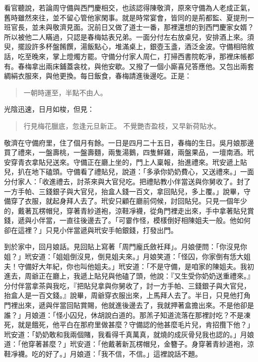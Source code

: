 看官聽說，若論周守備與西門慶相交，也該認得陳敬濟，原來守備為人老成正氣，舊時雖然來往，並不留心管他家閑事。就是時常宴會，皆同的是荊都監、夏提刑一班官長，並未與敬濟見面。況前日又做了道士一番，那裡還想的到西門慶家女婿？所以被他二人瞞過，只認是春梅姑表兄弟。一面分付左右放桌兒，安排酒上來。須臾，擺設許多杯盤餚饌，湯飯點心，堆滿桌上，銀壺玉盞，酒泛金波。守備相陪敘話，吃至晚來，掌上燈燭方罷。守備分付家人周仁，打掃西書院乾凈，那裡床帳都有。春梅拿出兩床鋪蓋衾枕，與他安歇。又撥了一個小廝喜兒答應他。又包出兩套綢絹衣服來，與他更換。每日飯食，春梅請進後邊吃。正是：
\begin{quote}
一朝時運至，半點不由人。
\end{quote}
光陰迅速，日月如梭，但見：
\begin{quote}
行見梅花臘底，忽逢元旦新正。
不覺艷杏盈枝，又早新荷貼水。
\end{quote}

敬濟在守備府里，住了個月有餘。一日是四月二十五日，春梅的生日。吳月娘那邊買了禮來，一盤壽桃，一盤壽麵，兩隻湯鵝，四隻鮮雞，兩盤果品，一壇南酒。玳安穿青衣拿貼兒送來。守備正在廳上坐的，門上人稟報，抬進禮來。玳安遞上貼兒，扒在地下磕頭。守備看了禮貼兒，說道：「多承你奶奶費心，又送禮來。」一面分付家人：「收進禮去，討茶來與大官兒吃。把禮貼教小伴當送與你舅收了。封了一方手帕、三錢銀子與大官兒，抬盒人錢一百文，拿回貼兒，多上覆。」說畢，守備穿了衣服，就起身拜人去了。玳安只顧在廳前伺候，討回貼兒。只見一個年少的，戴著瓦楞帽兒，穿著青紗道袍，涼鞋凈襪，從角門裡走出來，手中拿著貼兒賞錢，遞與小伴當，一直往後邊去了。「可霎作怪，模樣倒好相陳姐夫一般。他如何卻在這裡？」只見小伴當遞與玳安手帕銀錢，打發出門。

到於家中，回月娘話。見回貼上寫著「周門龐氏斂衽拜」。月娘便問：「你沒見你姐？」玳安道：「姐姐倒沒見，倒見姐夫來。」月娘笑道：「怪囚，你家倒有恁大姐夫！守備好大年紀，你也叫他姐夫。」玳安道：「不是守備，是咱家的陳姐夫。我初進去，周爺正在廳上，我遞上貼兒與他磕了頭，他說：『又生受你奶奶送重禮來。』分付伴當拿茶與我吃，『把貼兒拿與你舅收了，討一方手帕、三錢銀子與大官兒，抬盒人是一百文錢。』說畢，周爺穿衣服出來，上馬拜人去了。半日，只見他打角門裡出來，遞與伴當回貼賞賜，他就進後邊去了，我就押著盒擔出來。不是他卻是誰？」月娘道：「怪小囚兒，休胡說白道的。那羔子知道流落在那裡討吃？不是凍死，就是餓死，他平白在那府里做甚麼？守備認的他甚麼毛片兒，肯招攬下他？」玳安道：「奶奶敢和我兩個賭，我看得千真萬真，就燒的成灰骨兒我也認的。」月娘道：「他穿著甚麼？」玳安道：「他戴著新瓦楞帽兒，金簪子。身穿著青紗道袍，涼鞋凈襪。吃的好了。」月娘道：「我不信，不信。」這裡說話不題。


